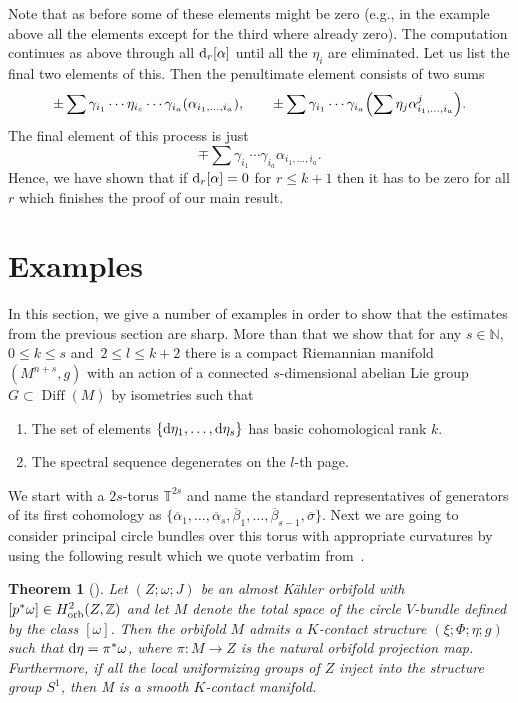 \documentclass[pdftex]{sigma}
\numberwithin{equation}{section}
\newtheorem{tw}{Theorem}[section]
\theoremstyle{definition}
\begin{document}
Note that as before some of these elements might be zero (e.g., in the example above all the elements except for the third where already zero). The computation continues as above through all ${\rm d}_r[\alpha]$ until all the $\eta_i$ are eliminated. Let us list the final two elements of this. Then the penultimate element consists of two sums
\[\pm\sum \gamma_{i_1}\cdots \eta_{i_{c}}\cdots \gamma_{i_{a}}(\alpha_{i_1,\dots,i_{a}}),\qquad \pm\sum \gamma_{i_1}\cdots \gamma_{i_{a}}\Bigl(\sum \eta_{j}\alpha_{i_1,\dots,i_{a}}^{j}\Bigr).\]
The final element of this process is just
\[\mp\sum \gamma_{i_1}\cdots \gamma_{i_{a}}\alpha_{i_1,\dots,i_{a}}.\]
Hence, we have shown that if ${\rm d}_r[\alpha]=0$ for $r\leq k+1$ then it has to be zero for all $r$ which finishes the proof of our main result.

\section{Examples}%
In this section, we give a number of examples in order to show that the estimates from the previous section are sharp. More than that we show that for any $s\in\mathbb{N}$, $0\leq k\leq s$ and~$2\leq l\leq k+2$ there is a compact Riemannian manifold $(M^{n+s},g)$ with an action of a connected $s$-dimensional abelian Lie group $G\subset \operatorname{Diff}(M)$ by isometries such that
\begin{enumerate}\itemsep=0pt
\item The set of elements $\{{\rm d}\eta_1,\dots,{\rm d}\eta_s\}$ has basic cohomological rank $k$.
\item The spectral sequence degenerates on the $l$-th page.
\end{enumerate}
We start with a $2s$-torus $\mathbb{T}^{2s}$ and name the standard representatives of generators of its first cohomology as $\{\overline{\alpha}_1,\dots,\overline{\alpha}_s,\overline{\beta}_1,\dots,\overline{\beta}_{s-1},\overline{\sigma}\}$. Next we are going to consider principal circle bundles over this torus with appropriate curvatures by using the following result which we quote verbatim from~\cite{BG}.

\begin{tw}[{\cite[Theorem 7.1.6]{BG}}] Let $(Z; \omega; J)$ be an almost K\"ahler orbifold with $[p^*\omega]\in H^2_{\rm orb}(Z,\mathbb{Z})$ and let $M$ denote the total space of the circle $V$-bundle defined by the class $[\omega]$. Then the orbifold $M$ admits a $K$-contact structure $(\xi; \Phi;\eta; g)$ such that ${\rm d}\eta = \pi^*\omega$, where $\pi\colon M\to Z$ is the natural orbifold projection map. Furthermore, if all the local uniformizing groups of $Z$ inject into the structure group $S^1$, then M is a smooth $K$-contact manifold.
\end{tw}
\end{document}
